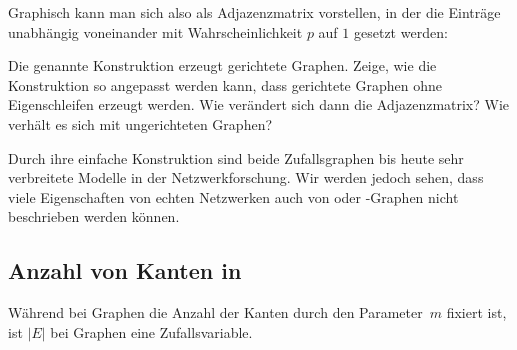 \noindent
Graphisch kann man sich also \Gnp als Adjazenzmatrix vorstellen, in der die Einträge unabhängig voneinander mit Wahrscheinlichkeit $p$ auf $1$ gesetzt werden:

\begin{center}

\end{center}

\begin{exercise}
    Die genannte Konstruktion erzeugt gerichtete Graphen.
    Zeige, wie die Konstruktion so angepasst werden kann, dass gerichtete Graphen ohne Eigenschleifen erzeugt werden.
    Wie verändert sich dann die Adjazenzmatrix?
    Wie verhält es sich mit ungerichteten Graphen?
\end{exercise}

Durch ihre einfache Konstruktion sind beide Zufallsgraphen bis heute sehr verbreitete Modelle in der Netzwerkforschung.
Wir werden jedoch sehen, dass viele Eigenschaften von echten Netzwerken auch von \Gnp oder \Gnm-Graphen nicht beschrieben werden können.

\subsection{Anzahl von Kanten in \Gnp}
Während bei \Gnm Graphen die Anzahl der Kanten durch den Parameter~$m$ fixiert ist, ist $|E|$ bei \Gnp Graphen eine Zufallsvariable.

